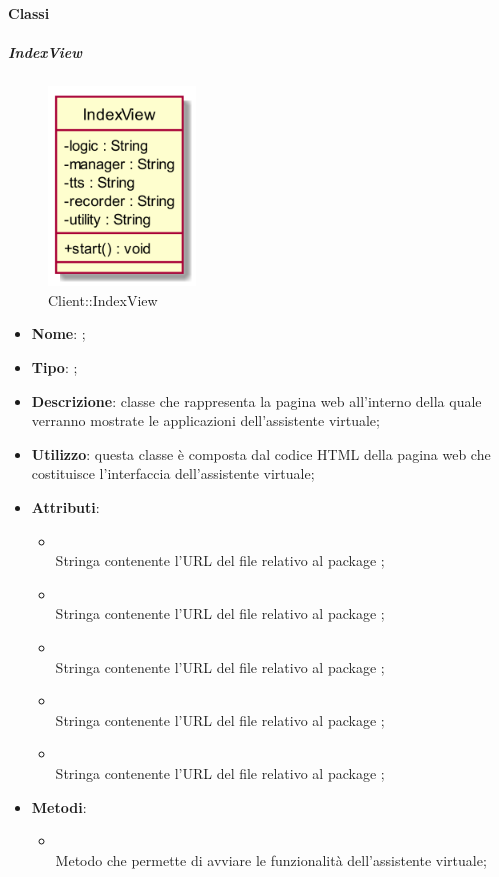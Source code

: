 \paragraph{Classi}
\hypertarget{IndexView_label}{\subparagraph{IndexView}}
\begin{figure}[h]
	\centering
	\includegraphics[width=0.35\textwidth,height=\textheight,keepaspectratio]{images/ClassIndexView.png}
	\caption{Client::IndexView}
\end{figure}
\begin{itemize}
	\item \textbf{Nome}: ;
	\item \textbf{Tipo}: ;
	\item \textbf{Descrizione}: classe che rappresenta la pagina web all'interno della quale verranno mostrate le applicazioni dell'assistente virtuale;
	\item \textbf{Utilizzo}: questa classe è composta dal codice HTML della pagina web che costituisce l'interfaccia dell'assistente virtuale;
	\item \textbf{Attributi}:
	\begin{itemize}
		\item[]  \\
		Stringa contenente l'URL del file relativo al package ;
		\item[]  \\
		Stringa contenente l'URL del file relativo al package ;
		\item[]  \\
		Stringa contenente l'URL del file relativo al package ;
		\item[]  \\
		Stringa contenente l'URL del file relativo al package ;
		\item[]  \\
		Stringa contenente l'URL del file relativo al package ;
	\end{itemize}
	\item \textbf{Metodi}:
	\begin{itemize}
		\item[]  \\		Metodo che permette di avviare le funzionalità dell'assistente virtuale;\\
	\end{itemize}
\end{itemize}
\FloatBarrier


